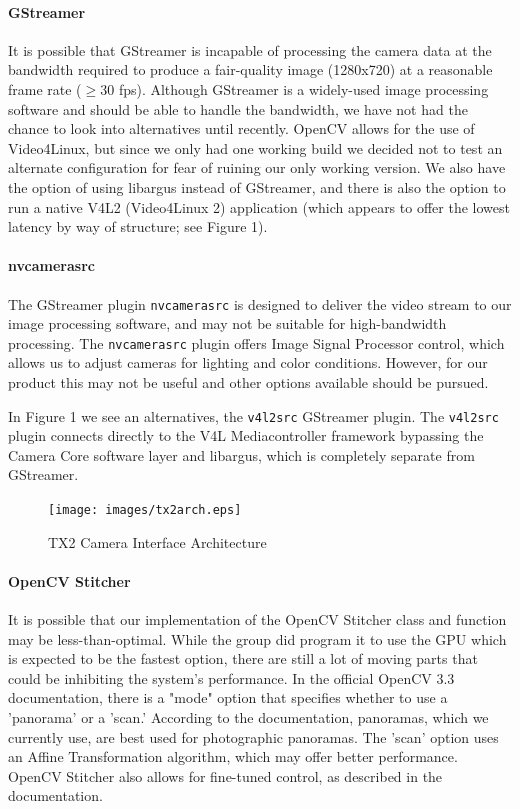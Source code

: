 \documentclass[letterpaper,10pt,serif,draftclsnofoot,onecolumn,compsoc,titlepage]{IEEEtran}
\begin{document}
\paragraph*{GStreamer} It is possible that GStreamer is incapable of processing the camera 
data at the bandwidth required to produce a fair-quality image (1280x720) at a reasonable 
frame rate ($\ge$30 fps). Although GStreamer is a widely-used image processing software 
and should be able to handle the bandwidth, we have not had the chance to look into 
alternatives until recently. OpenCV allows for the use of Video4Linux, but since we only 
had one working build we decided not to test an alternate configuration for fear of 
ruining our only working version. We also have the option of using libargus instead of 
GStreamer, and there is also the option to run a native V4L2 (Video4Linux 2) application 
(which appears to offer the lowest latency by way of structure; see Figure 1).

\paragraph*{nvcamerasrc} The GStreamer plugin \texttt{nvcamerasrc} is designed to deliver 
the video stream to our image processing software, and may not be suitable for 
high-bandwidth processing. The \texttt{nvcamerasrc} plugin offers Image Signal Processor 
control, which allows us to adjust cameras for lighting and color conditions. 
However, for our product this may not be useful and other options available should be 
pursued. 

In Figure 1 we see an alternatives, the \texttt{v4l2src} GStreamer plugin. The 
\texttt{v4l2src} plugin connects directly to the V4L Mediacontroller framework bypassing 
the Camera Core software layer and libargus, which is completely separate from GStreamer.

\begin{figure}[H]
  	\centering
	\label{fig:tx2arch}
	\texttt{[image: images/tx2arch.eps]}
	\caption{TX2 Camera Interface Architecture \label{overflow}}
\end{figure}

\paragraph*{OpenCV Stitcher} It is possible that our implementation of the OpenCV Stitcher 
class and function may be less-than-optimal. While the group did program it to use the GPU 
which is expected to be the fastest option, there are still a lot of moving parts that 
could be inhibiting the system's performance. In the official OpenCV 3.3 documentation, 
there is a "mode" option that specifies whether to use a 'panorama' or a 'scan.' According 
to the documentation, panoramas, which we currently 
use, are best used for photographic panoramas. The 'scan' option uses an Affine 
Transformation algorithm, which may offer better performance. OpenCV Stitcher also allows 
for fine-tuned control, as described in the documentation.
\end{document}
